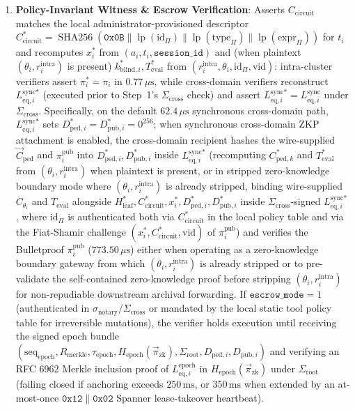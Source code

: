 \documentclass[conference,10pt]{IEEEtran}
\begin{document}
{\begin{enumerate}
    \item \textbf{Policy-Invariant Witness \& Escrow Verification}: Asserts $C_{\text{circuit}}$ matches the local administrator-provisioned descriptor $C_{\text{circuit}}^* = \operatorname{SHA256}(\mathtt{0x0B}\parallel\operatorname{lp}(\mathrm{id}_{\Pi})\parallel\operatorname{lp}(\text{type}_{\Pi})\parallel\operatorname{lp}(\text{expr}_{\Pi}))$ for $t_i$ and recomputes $x_i^*$ from $(a_i, t_i, \texttt{session\_id})$ and (when plaintext $(\theta_i, r_i^{\text{intra}})$ is present) $k_{\text{blind}, i}^*, T_{\text{eval}}^*$ from $(r_i^{\text{intra}}, \theta_i, \mathrm{id}_{\Pi}, \text{vid})$: intra-cluster verifiers assert $\pi_i^* = \pi_i$ in $0.77\,\mu\text{s}$, while cross-domain verifiers reconstruct $L_{\text{eq}, i}^{\text{sync}*}$ (executed prior to Step~1's $\Sigma_{\text{cross}}$ check) and assert $L_{\text{eq}, i}^{\text{sync}*} = L_{\text{eq}, i}^{\text{sync}}$ under $\Sigma_{\text{cross}}$. Specifically, on the default $62.4\,\mu\text{s}$ synchronous cross-domain path, $L_{\text{eq}, i}^{\text{sync}*}$ sets $D_{\text{ped}, i}^* = D_{\text{pub}, i}^* = 0^{256}$; when synchronous cross-domain ZKP attachment is enabled, the cross-domain recipient hashes the wire-supplied $\vec{C}_{\text{ped}}$ and $\pi_i^{\text{pub}}$ into $D_{\text{ped}, i}^*, D_{\text{pub}, i}^*$ inside $L_{\text{eq}, i}^{\text{sync}*}$ (recomputing $C_{\text{ped}, k}^*$ and $T_{\text{eval}}^*$ from $(\theta_i, r_i^{\text{intra}})$ when plaintext is present, or in stripped zero-knowledge boundary mode where $(\theta_i, r_i^{\text{intra}})$ is already stripped, binding wire-supplied $C_{\theta_i}$ and $T_{\text{eval}}$ alongside $H_{\text{leaf}}^*, C_{\text{circuit}}^*, x_i^*, D_{\text{ped}, i}^*, D_{\text{pub}, i}^*$ inside $\Sigma_{\text{cross}}$-signed $L_{\text{eq}, i}^{\text{sync}*}$, where $\mathrm{id}_{\Pi}$ is authenticated both via $C_{\text{circuit}}^*$ in the local policy table and via the Fiat-Shamir challenge $(x_i^*, C_{\text{circuit}}^*, \text{vid})$ of $\pi_i^{\text{pub}}$) and verifies the Bulletproof $\pi_i^{\text{pub}}$ ($773.50\,\mu\text{s}$) either when operating as a zero-knowledge boundary gateway from which $(\theta_i, r_i^{\text{intra}})$ is already stripped or to pre-validate the self-contained zero-knowledge proof before stripping $(\theta_i, r_i^{\text{intra}})$ for non-repudiable downstream archival forwarding. If $\texttt{escrow\_mode} = 1$ (authenticated in $\sigma_{\text{notary}} / \Sigma_{\text{cross}}$ or mandated by the local static tool policy table for irreversible mutations), the verifier holds execution until receiving the signed epoch bundle $(\text{seq}_{\text{epoch}}, R_{\text{merkle}}, \tau_{\text{epoch}}, H_{\text{epoch}}(\vec{\pi}_{\text{zk}}), \Sigma_{\text{root}}, D_{\text{ped}, i}, D_{\text{pub}, i})$ and verifying an RFC 6962 Merkle inclusion proof of $L_{\text{eq}, i}^{\text{epoch}}$ in $H_{\text{epoch}}(\vec{\pi}_{\text{zk}})$ under $\Sigma_{\text{root}}$ (failing closed if anchoring exceeds $250\,\text{ms}$, or $350\,\text{ms}$ when extended by an at-most-once $\mathtt{0x12} \parallel \mathtt{0x02}$ Spanner lease-takeover heartbeat).
\end{enumerate}\par}
\end{document}
